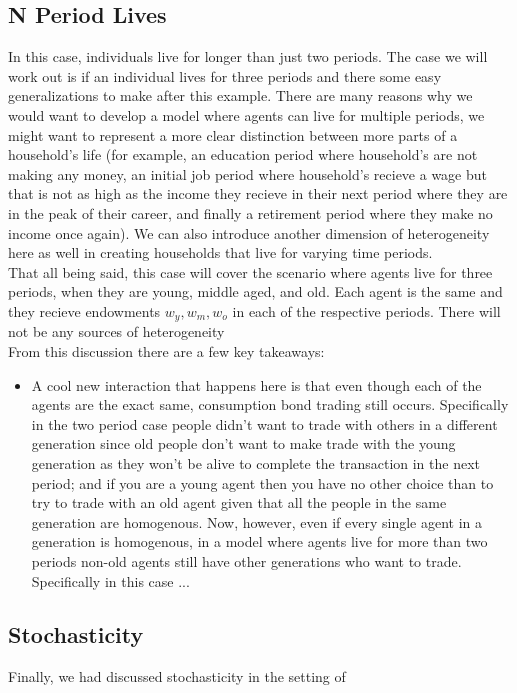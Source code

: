 \documentclass[11pt,english]{article}
\begin{document}
\subsection*{N Period Lives}

\noindent In this case, individuals live for longer than just two periods. The case we will work out is if an individual lives for three periods and there some easy generalizations to make after this example. There are many reasons why we would want to develop a model where agents can live for multiple periods, we might want to represent a more clear distinction between more parts of a household's life (for example, an education period where household's are not making any money, an initial job period where household's recieve a wage but that is not as high as the income they recieve in their next period where they are in the peak of their career, and finally a retirement period where they make no income once again). We can also introduce another dimension of heterogeneity here as well in creating households that live for varying time periods. \\

\noindent That all being said, this case will cover the scenario where agents live for three periods, when they are young, middle aged, and old. Each agent is the same and they recieve endowments $w_y, w_m, w_o$ in each of the respective periods. There will not be any sources of heterogeneity \\

\noindent From this discussion there are a few key takeaways:
\begin{itemize}
	\item A cool new interaction that happens here is that even though each of the agents are the exact same, consumption bond trading still occurs. Specifically in the two period case people didn't want to trade with others in a different generation since old people don't want to make trade with the young generation as they won't be alive to complete the transaction in the next period; and if you are a young agent then you have no other choice than to try to trade with an old agent given that all the people in the same generation are homogenous. Now, however, even if every single agent in a generation is homogenous, in a model where agents live for more than two periods non-old agents still have other generations who want to trade. Specifically in this case ...
\end{itemize}

\subsection*{Stochasticity}

Finally, we had discussed stochasticity in the setting of 
\end{document}

